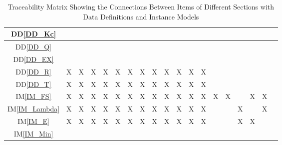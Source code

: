 \documentclass[12pt]{article}
\newcommand{\iref}[1]{IM\ref{#1}}
\newcommand{\ddref}[1]{DD\ref{#1}}
\begin{document}
{\begin{landscape}
\begin{table}[h!]
\begin{tabular}{|c|c|c|c|c|c|c|c|c|c|c|c|c|c|c|c|c|c|c|}
\ddref{DD_Kc}           & & & & & & & & & & & & & & & & & & \\ \hline
\ddref{DD_Q}            & & & & & & & & & & & & & & & & & & \\ \hline
\ddref{DD_EX}           & & & & & & & & & & & & & & & & & & \\ \hline
\ddref{DD_R}            & X& X& X& X& X& X& X& X& X& X& X& X& & & & & & \\ 
\hline
\ddref{DD_T}            & X& X& X& X& X& X& X& X& X& X& X& X& & & & & & \\ 
\hline
\iref{IM_FS}            & X& X& X& X& X& X& X& X& X& X& X& X& X& X& & X& X& \\ 
\hline
\iref{IM_Lambda}        & X& X& X& X& X& X& X& X& X& X& X& X& & & X& & X& \\ 
\hline
\iref{IM_E}             & X& X& X& X& X& X& X& X& X& X& X& X& & & X& X& & \\ 
\hline
\iref{IM_Min}           & & & & & & & & & & & & & & & & & & \\
\hline
\end{tabular}
\caption{Traceability Matrix Showing the Connections Between Items of Different 
	Sections with Data Definitions and Instance Models}
\label{Table:trace2}
\end{table}
\end{landscape}
}
\end{document}
